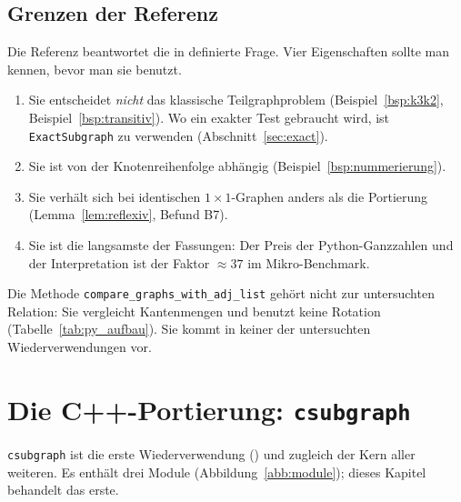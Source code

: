 \section{Grenzen der Referenz}
\label{sec:py_grenzen}

Die Referenz beantwortet die in \cite{epp2026subgraph} definierte Frage. Vier Eigenschaften sollte man kennen, bevor man sie benutzt.

\begin{enumerate}
	\item Sie entscheidet \emph{nicht} das klassische Teilgraphproblem (Beispiel~\ref{bsp:k3k2}, Beispiel~\ref{bsp:transitiv}). Wo ein exakter Test gebraucht wird, ist \texttt{ExactSubgraph} zu verwenden (Abschnitt~\ref{sec:exact}).
	\item Sie ist von der Knotenreihenfolge abhängig (Beispiel~\ref{bsp:nummerierung}).
	\item Sie verhält sich bei identischen $1\times1$-Graphen anders als die Portierung (Lemma~\ref{lem:reflexiv}, Befund B7).
	\item Sie ist die langsamste der Fassungen: Der Preis der Python-Ganzzahlen und der Interpretation ist der Faktor $\approx 37$ im Mikro-Benchmark.
\end{enumerate}

Die Methode \texttt{compare\_graphs\_with\_adj\_list} gehört nicht zur untersuchten Relation: Sie vergleicht Kantenmengen und benutzt keine Rotation (Tabelle~\ref{tab:py_aufbau}). Sie kommt in keiner der untersuchten Wiederverwendungen vor.

\chapter{Die C++-Portierung: \texttt{csubgraph}}
\label{chap:cpp_portierung}

\texttt{csubgraph} ist die erste Wiederverwendung () und zugleich der Kern aller weiteren. Es enthält drei Module (Abbildung~\ref{abb:module}); dieses Kapitel behandelt das erste.


